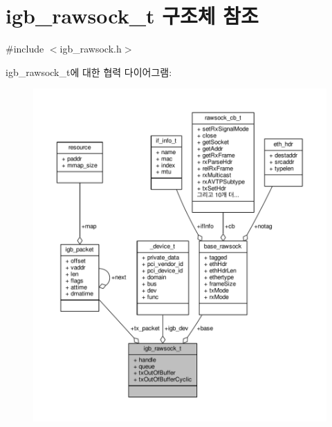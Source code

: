 \hypertarget{structigb__rawsock__t}{}\section{igb\+\_\+rawsock\+\_\+t 구조체 참조}
\label{structigb__rawsock__t}


{\ttfamily \#include $<$igb\+\_\+rawsock.\+h$>$}



igb\+\_\+rawsock\+\_\+t에 대한 협력 다이어그램\+:
\nopagebreak
\begin{figure}[H]
\begin{center}
\leavevmode
\includegraphics[width=350pt]{structigb__rawsock__t__coll__graph}
\end{center}
\end{figure}
